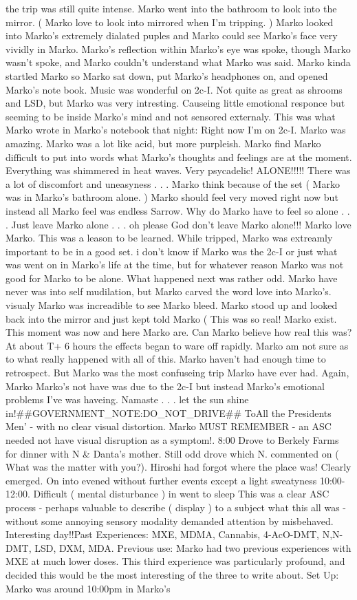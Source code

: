 \documentclass[12pt]{book}
\begin{document}
the trip was still quite intense. Marko went into the bathroom to look into the mirror. ( Marko love to look into mirrored when I'm tripping. ) Marko looked into Marko's extremely dialated puples and Marko could see Marko's face very vividly in Marko. Marko's reflection within Marko's eye was spoke, though Marko wasn't spoke, and Marko couldn't understand what Marko was said. Marko kinda startled Marko so Marko sat down, put Marko's headphones on, and opened Marko's note book. Music was wonderful on 2c-I. Not quite as great as shrooms and LSD, but Marko was very intresting. Causeing little emotional responce but seeming to be inside Marko's mind and not sensored externaly. This was what Marko wrote in Marko's notebook that night: Right now I'm on 2c-I. Marko was amazing. Marko was a lot like acid, but more purpleish. Marko find Marko difficult to put into words what Marko's thoughts and feelings are at the moment. Everything was shimmered in heat waves. Very psycadelic! ALONE!!!!! There was a lot of discomfort and uneasyness . . .  Marko think because of the set (  Marko was in Marko's bathroom alone. ) Marko should feel very moved right now but instead all Marko feel was endless Sarrow. Why do Marko have to feel so alone . . .  Just leave Marko alone . . .  oh please God don't leave Marko alone!!! Marko love Marko. This was a leason to be learned. While tripped, Marko was extreamly important to be in a good set. i don't know if Marko was the 2c-I or just what was went on in Marko's life at the time, but for whatever reason Marko was not good for Marko to be alone. What happened next was rather odd. Marko have never was into self mudilation, but Marko carved the word love into Marko's. visualy Marko was increadible to see Marko bleed. Marko stood up and looked back into the mirror and just kept told Marko ( This was so real! Marko exist. This moment was now and here Marko are. Can Marko believe how real this was? At about T+ 6 hours the effects began to ware off rapidly. Marko am not sure as to what really happened with all of this. Marko haven't had enough time to retrospect. But Marko was the most confuseing trip Marko have ever had. Again, Marko Marko's not have was due to the 2c-I but instead Marko's emotional problems I've was haveing. Namaste . . .  let the sun shine in!\#\#GOVERNMENT\_NOTE:DO\_NOT\_DRIVE\#\# ToAll the Presidents Men' - with no clear visual distortion. Marko MUST REMEMBER - an ASC needed not have visual disruption as a symptom!. 8:00 Drove to Berkely Farms for dinner with N \& Danta's mother. Still odd drove which N. commented on ( What was the matter with you?). Hiroshi had forgot where the place was! Clearly emerged. On into evened without further events except a light sweatyness 10:00-12:00. Difficult ( mental disturbance ) in went to sleep This was a clear ASC process - perhaps valuable to describe ( display ) to a subject what this all was - without some annoying sensory modality demanded attention by misbehaved. Interesting day!!Past Experiences: MXE, MDMA, Cannabis, 4-AcO-DMT, N,N-DMT, LSD, DXM, MDA. Previous use: Marko had two previous experiences with MXE at much lower doses. This third experience was particularly profound, and decided this would be the most interesting of the three to write about. Set Up: Marko was around 10:00pm in Marko's 
\end{document}
